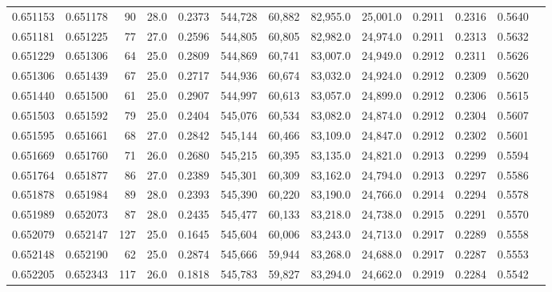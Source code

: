 \begin{tabular}{rrrrrrrrrrrrr}
0.651153 & 0.651178 &    90 & 28.0 &                                     0.2373 & 544,728 &  60,882 &  82,955.0 &  25,001.0 & 0.2911 & 0.2316 & 0.5640 \\
0.651181 & 0.651225 &    77 & 27.0 &                                     0.2596 & 544,805 &  60,805 &  82,982.0 &  24,974.0 & 0.2911 & 0.2313 & 0.5632 \\
0.651229 & 0.651306 &    64 & 25.0 &                                     0.2809 & 544,869 &  60,741 &  83,007.0 &  24,949.0 & 0.2912 & 0.2311 & 0.5626 \\
0.651306 & 0.651439 &    67 & 25.0 &                                     0.2717 & 544,936 &  60,674 &  83,032.0 &  24,924.0 & 0.2912 & 0.2309 & 0.5620 \\
0.651440 & 0.651500 &    61 & 25.0 &                                     0.2907 & 544,997 &  60,613 &  83,057.0 &  24,899.0 & 0.2912 & 0.2306 & 0.5615 \\
0.651503 & 0.651592 &    79 & 25.0 &                                     0.2404 & 545,076 &  60,534 &  83,082.0 &  24,874.0 & 0.2912 & 0.2304 & 0.5607 \\
0.651595 & 0.651661 &    68 & 27.0 &                                     0.2842 & 545,144 &  60,466 &  83,109.0 &  24,847.0 & 0.2912 & 0.2302 & 0.5601 \\
0.651669 & 0.651760 &    71 & 26.0 &                                     0.2680 & 545,215 &  60,395 &  83,135.0 &  24,821.0 & 0.2913 & 0.2299 & 0.5594 \\
0.651764 & 0.651877 &    86 & 27.0 &                                     0.2389 & 545,301 &  60,309 &  83,162.0 &  24,794.0 & 0.2913 & 0.2297 & 0.5586 \\
0.651878 & 0.651984 &    89 & 28.0 &                                     0.2393 & 545,390 &  60,220 &  83,190.0 &  24,766.0 & 0.2914 & 0.2294 & 0.5578 \\
0.651989 & 0.652073 &    87 & 28.0 &                                     0.2435 & 545,477 &  60,133 &  83,218.0 &  24,738.0 & 0.2915 & 0.2291 & 0.5570 \\
0.652079 & 0.652147 &   127 & 25.0 &                                     0.1645 & 545,604 &  60,006 &  83,243.0 &  24,713.0 & 0.2917 & 0.2289 & 0.5558 \\
0.652148 & 0.652190 &    62 & 25.0 &                                     0.2874 & 545,666 &  59,944 &  83,268.0 &  24,688.0 & 0.2917 & 0.2287 & 0.5553 \\
0.652205 & 0.652343 &   117 & 26.0 &                                     0.1818 & 545,783 &  59,827 &  83,294.0 &  24,662.0 & 0.2919 & 0.2284 & 0.5542 \\

\end{tabular}
